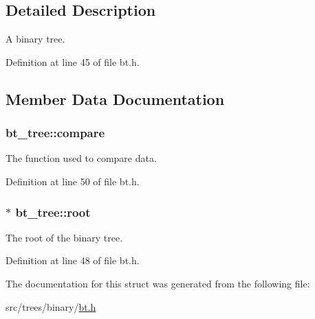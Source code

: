 \subsection{Detailed Description}
A binary tree. 

Definition at line 45 of file bt.h.



\subsection{Member Data Documentation}
\hypertarget{structbt__tree_a7ac2a5e50551c1a10b1bf3884cd12af5}{
\subsubsection[{compare}]{ {\bf bt\_\-tree::compare}}}
\label{structbt__tree_a7ac2a5e50551c1a10b1bf3884cd12af5}


The function used to compare data. 



Definition at line 50 of file bt.h.

\hypertarget{structbt__tree_ae428a77981f3b9f27f959b78ed468db7}{
\subsubsection[{root}]{$\ast$ {\bf bt\_\-tree::root}}}
\label{structbt__tree_ae428a77981f3b9f27f959b78ed468db7}


The root of the binary tree. 



Definition at line 48 of file bt.h.



The documentation for this struct was generated from the following file:\begin{DoxyCompactItemize}
\item 
src/trees/binary/\hyperlink{bt_8h}{bt.h}\end{DoxyCompactItemize}
